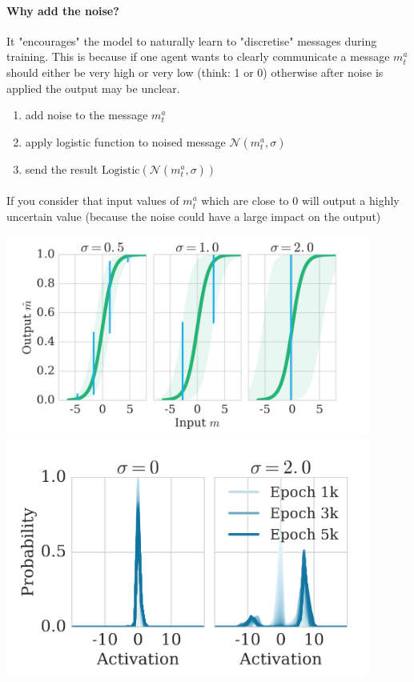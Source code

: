 \documentclass{article}
\begin{document}
    \paragraph{Why add the noise?} It "encourages" the model to naturally learn to "discretise" messages during training. This is because if one agent wants to clearly communicate a message $m^a_t$ should either be very high or very low (think: 1 or 0) otherwise after noise is applied the output may be unclear.
    \begin{enumerate}
        \item add noise to the message $m^a_t$ 
        \item apply logistic function to noised message $\mathcal{N}(m^a_t, \sigma)$
        \item send the result $\text{Logistic}(\mathcal{N}(m^a_t, \sigma))$
    \end{enumerate}

    \paragraph{} If you consider that input values of $m^a_t$ which are close to 0 will output a highly uncertain value (because the noise could have a large impact on the output)

    \includegraphics[width=12cm]{fig2.png}
    \includegraphics[width=12cm]{fig3.png}
\end{document}
